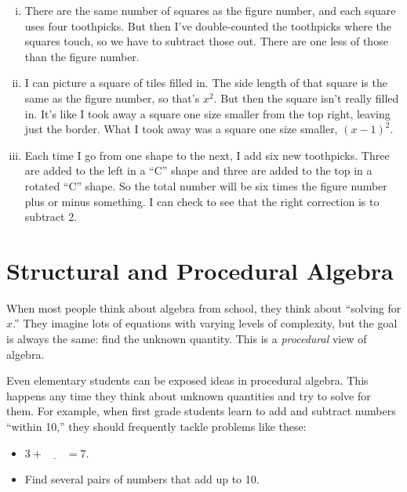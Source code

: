 \documentclass[12pt, reqno]{amsart}
\theoremstyle{remark}
\theoremstyle{definition}
\numberwithin{equation}{section}  %
\begin{document}
\begin{enumerate}[(i)]
\item
There are the same number of squares as the figure number, and each square uses four toothpicks.  But then I've double-counted the toothpicks  where the squares touch, so we have to subtract those out.  There are one less of those than the figure number.\\

\newpage 

\item
I can picture a square of tiles filled in.  The side length of that square is the same as the figure number, so that's $x^2$.  But then the square isn't really filled in.  It's like I took away a square one size smaller from the top right, leaving just the border.  What I took away was a square one size smaller, $(x-1)^2$.\\

\item
Each time I go from one shape to the next, I add six new toothpicks.  Three are added to the left in a ``C'' shape and three are added to the top in a rotated ``C'' shape.  So the total number will be six times the figure number plus or minus something.  I can check to see that the right correction is to subtract 2.\\


\end{enumerate}




\newpage



\section{Structural and Procedural Algebra}
When most people think about algebra from school, they think about ``solving for $x$.''  They imagine lots of equations with varying levels of complexity, but the goal is always the same: find the unknown quantity.  This is a \emph{procedural} view of algebra.  

Even elementary students can  be exposed  ideas in procedural algebra.   This happens any time   they think about unknown quantities and try to solve for them.  For example, when first grade students learn to add and subtract numbers ``within 10,'' they should frequently tackle problems like these:

\begin{itemize}
\item
$3 + \underline{\qquad} = 7$.\\
\medskip
\item
Find several pairs of numbers that add up to 10.\\
\medskip
\end{itemize}
\end{document}
